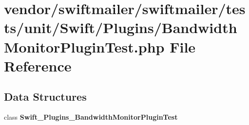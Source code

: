 \section{vendor/swiftmailer/swiftmailer/tests/unit/\+Swift/\+Plugins/\+Bandwidth\+Monitor\+Plugin\+Test.php File Reference}
\label{_bandwidth_monitor_plugin_test_8php}
\subsection*{Data Structures}
\begin{DoxyCompactItemize}
\item 
class {\bf Swift\+\_\+\+Plugins\+\_\+\+Bandwidth\+Monitor\+Plugin\+Test}
\end{DoxyCompactItemize}
